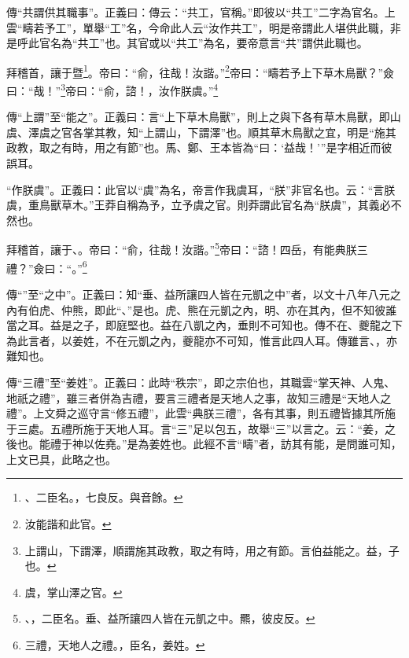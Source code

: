 {\noindent\zhuan{}\fzbyks 傳“共謂供其職事”。正義曰：傳云：“共工，官稱。”即彼以“共工”二字為官名。上雲“疇若予工”，單舉“工”名，今命此人云“汝作共工”，明是帝謂此人堪供此職，非是呼此官名為“共工”也。其官或以“共工”為名，要帝意言“共”謂供此職也。 \par}

拜稽首，讓于暨\footnote{、二臣名。，七良反。與音餘。}。帝曰：“俞，往哉！汝諧。”\footnote{汝能諧和此官。}帝曰：“疇若予上下草木鳥獸？”僉曰：“哉！”\footnote{上謂山，下謂澤，順謂施其政教，取之有時，用之有節。言伯益能之。益，子也。}帝曰：“俞，諮！，汝作朕虞。”\footnote{虞，掌山澤之官。}

{\noindent\zhuan{}\fzbyks 傳“上謂”至“能之”。正義曰：言“上下草木鳥獸”，則上之與下各有草木鳥獸，即山虞、澤虞之官各掌其教，知“上謂山，下謂澤”也。順其草木鳥獸之宜，明是“施其政教，取之有時，用之有節”也。馬、鄭、王本皆為“曰：‘益哉！’”是字相近而彼誤耳。 \par}

{\noindent\zhuan{}\fzbyks “作朕虞”。正義曰：此官以“虞”為名，帝言作我虞耳，“朕”非官名也。云：“言朕虞，重鳥獸草木。”王莽自稱為予，立予虞之官。則莽謂此官名為“朕虞”，其義必不然也。 \par}

拜稽首，讓于、。帝曰：“俞，往哉！汝諧。”\footnote{、，二臣名。垂、益所讓四人皆在元凱之中。羆，彼皮反。}帝曰：“諮！四岳，有能典朕三禮？”僉曰：“。”\footnote{三禮，天地人之禮。，臣名，姜姓。}

{\noindent\zhuan{}\fzbyks 傳“”至“之中”。正義曰：知“垂、益所讓四人皆在元凱之中”者，以文十八年八元之內有伯虎、仲熊，即此“、”是也。虎、熊在元凱之內，明、亦在其內，但不知彼誰當之耳。益是之子，即庭堅也。益在八凱之內，垂則不可知也。傳不在、夔龍之下為此言者，以姜姓，不在元凱之內，夔龍亦不可知，惟言此四人耳。傳雖言、，亦難知也。 \par}

{\noindent\zhuan{}\fzbyks 傳“三禮”至“姜姓”。正義曰：此時“秩宗”，即之宗伯也，其職雲“掌天神、人鬼、地祇之禮”，雖三者併為吉禮，要言三禮者是天地人之事，故知三禮是“天地人之禮”。上文舜之巡守言“修五禮”，此雲“典朕三禮”，各有其事，則五禮皆據其所施于三處。五禮所施于天地人耳。言“三”足以包五，故舉“三”以言之。云：“姜，之後也。能禮于神以佐堯。”是為姜姓也。此經不言“疇”者，訪其有能，是問誰可知，上文已具，此略之也。 \par}

